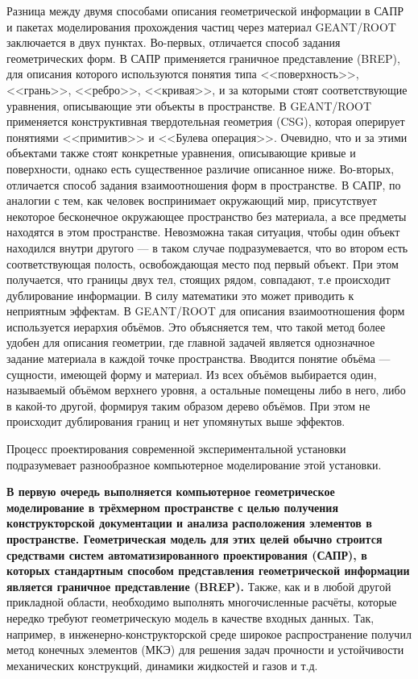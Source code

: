 Разница между двумя способами описания геометрической информации в САПР и пакетах моделирования прохождения частиц через материал GEANT/ROOT заключается в двух пунктах. Во-первых, отличается способ задания геометрических форм. В САПР применяется граничное представление (BREP), для описания которого используются понятия типа <<поверхность>>, <<грань>>, <<ребро>>, <<кривая>>, и за которыми стоят соответствующие уравнения, описывающие эти объекты в пространстве. В GEANT/ROOT применяется конструктивная твердотельная геометрия (CSG), которая оперирует понятиями <<примитив>> и <<Булева операция>>. Очевидно, что и за этими объектами также стоят конкретные уравнения, описывающие кривые и поверхности, однако есть существенное различие описанное ниже. Во-вторых, отличается способ задания взаимоотношения форм в пространстве. В САПР, по аналогии с тем, как человек воспринимает окружающий мир, присутствует некоторое бесконечное окружающее пространство без материала, а все предметы находятся в этом пространстве. Невозможна такая ситуация, чтобы один объект находился внутри другого --- в таком случае подразумевается, что во втором есть соответствующая полость, освобождающая место под первый объект. При этом получается, что границы двух тел, стоящих рядом, совпадают, т.е происходит дублирование информации.
\todo В силу математики это может приводить к неприятным эффектам. \todo
В GEANT/ROOT для описания взаимоотношения форм используется иерархия объёмов. Это объясняется тем, что такой метод более удобен для описания геометрии, где главной задачей является однозначное задание материала в каждой точке пространства. Вводится понятие объёма --- сущности, имеющей форму и материал. Из всех объёмов выбирается один, называемый объёмом верхнего уровня, а остальные помещены либо в него, либо в какой-то другой, формируя таким образом дерево объёмов.
\todo При этом не происходит дублирования границ и нет упомянутых выше эффектов. \todo

Процесс проектирования современной экспериментальной установки подразумевает разнообразное компьютерное моделирование этой установки.

\textbf{В первую очередь выполняется компьютерное геометрическое моделирование в трёхмерном пространстве с целью получения конструкторской документации и анализа расположения элементов в пространстве. Геометрическая модель для этих целей обычно строится средствами систем автоматизированного проектирования (САПР), в которых стандартным способом представления геометрической информации является граничное представление (BREP).}
Также, как и в любой другой прикладной области, необходимо выполнять многочисленные расчёты, которые нередко требуют геометрическую модель в качестве входных данных.
Так, например, в инженерно-конструкторской среде широкое распространение получил метод конечных элементов (МКЭ) для решения задач прочности и устойчивости механических конструкций, динамики жидкостей и газов и т.д.

